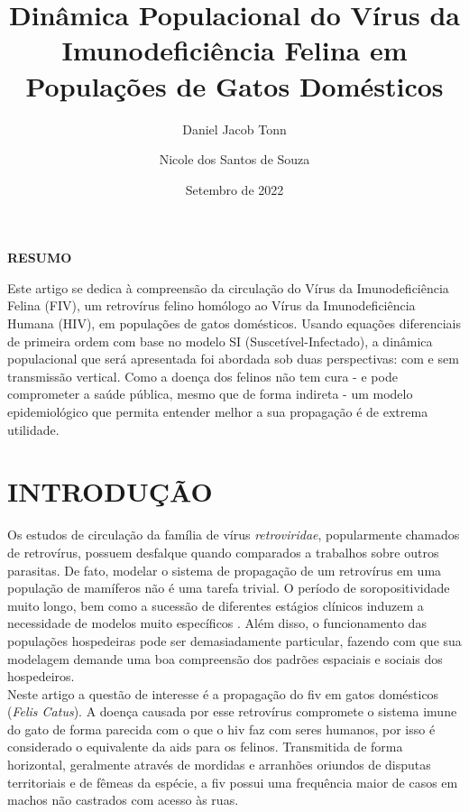 \documentclass{article}
\title{Dinâmica Populacional do Vírus da Imunodeficiência Felina em
Populações de Gatos Domésticos}
\author[1]{Daniel Jacob Tonn}
\author[1]{Nicole dos Santos de Souza}
\affil[1]{Escola de Matemática Aplicada - FGV EMAp, Rio de Janeiro, RJ}
\date{Setembro de 2022}
\begin{document}
\maketitle
\begin{center}
    \textbf{RESUMO}
\end{center}


\noindent Este artigo se dedica à compreensão da circulação do Vírus da Imunodeficiência Felina (FIV), um
retrovírus felino homólogo ao Vírus da Imunodeficiência Humana (HIV), em populações de gatos domésticos. Usando equações diferenciais de primeira ordem com base no modelo SI (Suscetível-Infectado), a dinâmica populacional que será apresentada foi abordada sob duas perspectivas: com e sem transmissão vertical. Como a doença dos felinos não tem cura - e pode comprometer a saúde pública, mesmo que de forma indireta - um modelo epidemiológico que permita entender melhor a sua propagação é de extrema utilidade.
\\

\noindent
{}

\newpage
\printglossary[title ={Lista de Abreviaturas e siglas}]
\newpage

\tableofcontents

\newpage
\section*{INTRODUÇÃO}
Os estudos de circulação da família de vírus  \textit{retroviridae}, popularmente chamados de retrovírus, possuem desfalque quando comparados a trabalhos sobre outros parasitas. De fato, modelar o sistema de propagação de um retrovírus em uma população de mamíferos não é uma tarefa trivial. O período de soropositividade muito longo, bem como a sucessão de diferentes estágios clínicos induzem a necessidade de modelos muito específicos \cite{base}. Além disso, o funcionamento das populações hospedeiras pode ser demasiadamente particular, fazendo com que sua modelagem demande uma boa compreensão dos padrões espaciais e sociais dos hospedeiros.\\

\noindent Neste artigo a questão de interesse é a propagação do \gls{fiv} em gatos domésticos (\textit{Felis Catus}). A doença causada por esse retrovírus compromete o sistema imune do gato de forma parecida com o que o \gls{hiv} faz com seres humanos, por isso é considerado o equivalente da \gls{aids}  para os felinos. Transmitida de forma horizontal, geralmente através de mordidas e arranhões oriundos de  disputas territoriais e de fêmeas da espécie,  a \gls{fiv} possui uma frequência maior de casos em machos não castrados com acesso às ruas.\\
\end{document}
